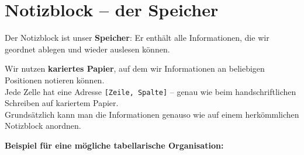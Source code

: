 \documentclass{article}
\begin{document}
    
      
        \section{Notizblock – der Speicher}
        
Der Notizblock ist unser \textbf{Speicher}: Er enthält alle Informationen, die wir geordnet ablegen und wieder auslesen können.


        
Wir nutzen \textbf{kariertes Papier}, auf dem wir Informationen an beliebigen Positionen notieren können.\\
          Jede Zelle hat eine Adresse \texttt{[Zeile, Spalte]} – genau wie beim handschriftlichen Schreiben auf kariertem Papier.\\
          Grundsätzlich kann man die Informationen genauso wie auf einem herkömmlichen Notizblock anordnen.


        
\textbf{Beispiel für eine mögliche tabellarische Organisation:}
\end{document}
